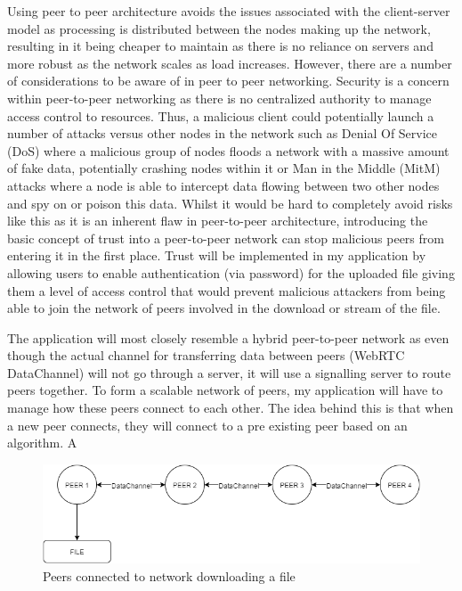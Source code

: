 \documentclass[]{report}
\begin{document}
			Using peer to peer architecture avoids the issues associated with the client-server model as processing is distributed between the nodes making up the network, resulting in it being cheaper to maintain as there is no reliance on servers and more robust as the network scales as load increases. However, there are a number of considerations to be aware of in peer to peer networking. Security is a concern within peer-to-peer networking as there is no centralized authority to manage access control to resources. Thus, a malicious client could potentially launch a number of attacks versus other nodes in the network such as Denial Of Service (DoS) where a malicious group of nodes floods a network with a massive amount of fake data, potentially crashing nodes within it or Man in the Middle (MitM) attacks where a node is able to intercept data flowing between two other nodes and spy on or poison this data\cite{P2P Security Issues}.	Whilst it would be hard to completely avoid risks like this as it is an inherent flaw in peer-to-peer architecture, introducing the basic concept of trust into a peer-to-peer network can stop malicious peers from entering it in the first place. Trust will be implemented in my application by allowing users to enable authentication (via password) for the uploaded file giving them a level of access control that would prevent malicious attackers from being able to join the network of peers involved in the download or stream of the file. 
			
			The application will most closely resemble a hybrid peer-to-peer network as even though the actual channel for transferring data between peers (WebRTC DataChannel) will not go through a server, it will use a signalling server to route peers together. To form a scalable network of peers, my application will have to manage how these peers connect to each other. The idea behind this is that when a new peer connects, they will connect to a pre existing peer based on an algorithm. A	
			\begin{figure}[h!]
				\centering
				\caption{Peers connected to network downloading a file}
				\includegraphics[scale=0.6]{network.png}
			\end{figure}
			
\end{document}
